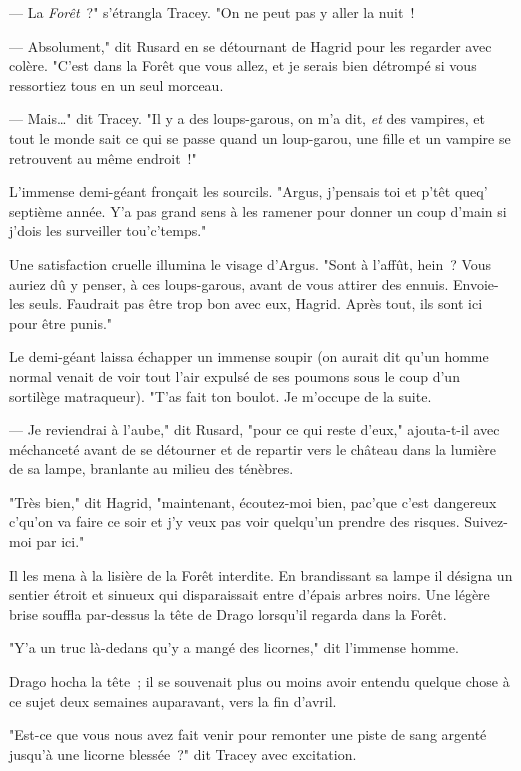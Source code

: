 --- La \emph{Forêt}~?" s'étrangla Tracey. "On ne peut pas y aller la nuit~!

--- Absolument," dit Rusard en se détournant de Hagrid pour les regarder avec colère. "C'est dans la Forêt que vous allez, et je serais bien détrompé si vous ressortiez tous en un seul morceau.

--- Mais…" dit Tracey. "Il y a des loups-garous, on m'a dit, \emph{et} des vampires, et tout le monde sait ce qui se passe quand un loup-garou, une fille et un vampire se retrouvent au même endroit~!"

L'immense demi-géant fronçait les sourcils. "Argus, j'pensais toi et p'têt queq' septième année. Y'a pas grand sens à les ramener pour donner un coup d'main si j'dois les surveiller tou'c'temps."

Une satisfaction cruelle illumina le visage d'Argus. "Sont à l'affût, hein~? Vous auriez dû y penser, à ces loups-garous, avant de vous attirer des ennuis. Envoie-les seuls. Faudrait pas être trop bon avec eux, Hagrid. Après tout, ils sont ici pour être punis."

Le demi-géant laissa échapper un immense soupir (on aurait dit qu'un homme normal venait de voir tout l'air expulsé de ses poumons sous le coup d'un sortilège matraqueur). "T'as fait ton boulot. Je m'occupe de la suite.

--- Je reviendrai à l'aube," dit Rusard, "pour ce qui reste d'eux," ajouta-t-il avec méchanceté avant de se détourner et de repartir vers le château dans la lumière de sa lampe, branlante au milieu des ténèbres.

"Très bien," dit Hagrid, "maintenant, écoutez-moi bien, pac'que c'est dangereux c'qu'on va faire ce soir et j'y veux pas voir quelqu'un prendre des risques. Suivez-moi par ici."

Il les mena à la lisière de la Forêt interdite. En brandissant sa lampe il désigna un sentier étroit et sinueux qui disparaissait entre d'épais arbres noirs. Une légère brise souffla par-dessus la tête de Drago lorsqu'il regarda dans la Forêt.

"Y'a un truc là-dedans qu'y a mangé des licornes," dit l'immense homme.

Drago hocha la tête~; il se souvenait plus ou moins avoir entendu quelque chose à ce sujet deux semaines auparavant, vers la fin d'avril.

"Est-ce que vous nous avez fait venir pour remonter une piste de sang argenté jusqu'à une licorne blessée~?" dit Tracey avec excitation.


